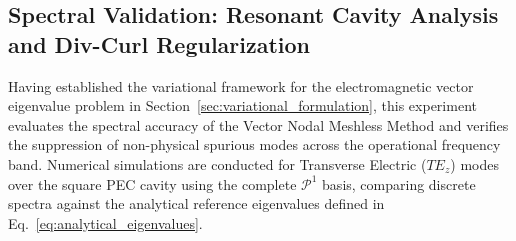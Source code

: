 \documentclass[preprint,12pt]{elsarticle}
\begin{document}
\subsection{Spectral Validation: Resonant Cavity Analysis and Div-Curl Regularization}
\label{subsec:cavity_eigenvalues}
Having established the variational framework for the electromagnetic vector eigenvalue problem in Section~\ref{sec:variational_formulation}, this experiment evaluates the spectral accuracy of the Vector Nodal Meshless Method and verifies the suppression of non-physical spurious modes across the operational frequency band. Numerical simulations are conducted for Transverse Electric ($TE_z$) modes over the square PEC cavity using the complete $\mathcal{P}^1$ basis, comparing discrete spectra against the analytical reference eigenvalues defined in Eq.~\eqref{eq:analytical_eigenvalues}.
\end{document}
